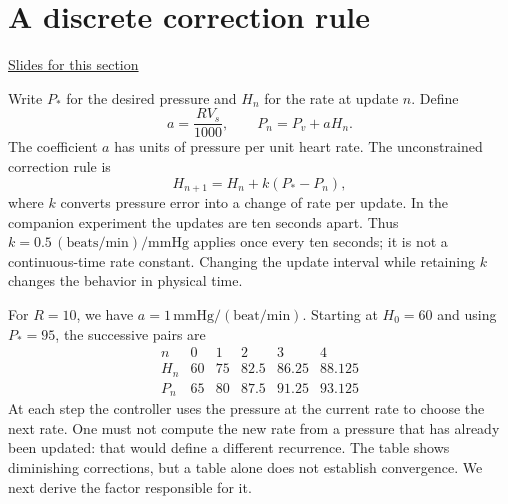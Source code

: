 \documentclass[11pt,letterpaper]{article}
\theoremstyle{definition}\newtheorem{definition}{Definition}\newtheorem{example}{Example}
\numberwithin{equation}{section}
\begin{document}
\section{A discrete correction rule}
\hypertarget{note-a-discrete-correction-rule}{}\label{note:a-discrete-correction-rule}
{\small \href{slides.html\#frame=a-measured-error-changes-the-next-rate-figure\&step=1}{Slides for this section}}\par
Write $P_*$ for the desired pressure and $H_n$ for the rate at update $n$. Define
\begin{equation}a=\frac{RV_s}{1000},\qquad P_n=P_v+aH_n.\end{equation}
The coefficient $a$ has units of pressure per unit heart rate. The unconstrained correction rule is
\begin{equation}H_{n+1}=H_n+k(P_*-P_n),\label{eq:controller}\end{equation}
where $k$ converts pressure error into a change of rate per update. In the companion experiment the updates are ten seconds apart. Thus $k=0.5\,(\mathrm{beats/min})/\mathrm{mmHg}$ applies once every ten seconds; it is not a continuous-time rate constant. Changing the update interval while retaining $k$ changes the behavior in physical time.

For $R=10$, we have $a=1\,\mathrm{mmHg}/(\mathrm{beat/min})$. Starting at $H_0=60$ and using $P_*=95$, the successive pairs are
\[
\begin{array}{c|rrrrr}
n&0&1&2&3&4\\\hline
H_n&60&75&82.5&86.25&88.125\\
P_n&65&80&87.5&91.25&93.125
\end{array}
\]
At each step the controller uses the pressure at the current rate to choose the next rate. One must not compute the new rate from a pressure that has already been updated: that would define a different recurrence. The table shows diminishing corrections, but a table alone does not establish convergence. We next derive the factor responsible for it.
\end{document}
